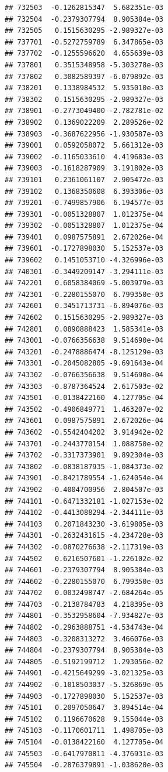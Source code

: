 \documentclass[ignorenonframetext,]{beamer}
\begin{document}
\begin{frame}[fragile]
\begin{verbatim}
## 732503  -0.1262815347  5.682351e-03
## 732504  -0.2379307794  8.905384e-03
## 732505   0.1515630295 -2.989327e-03
## 737701  -0.5272759789  6.347865e-03
## 737702  -0.1255596620  4.655639e-03
## 737801   0.3515348958 -5.303278e-03
## 737802   0.3082589397 -6.079892e-03
## 738201   0.1338984532  5.935010e-03
## 738302   0.1515630295 -2.989327e-03
## 738901  -0.2773049400 -2.782781e-02
## 738902   0.1369022209  2.289526e-02
## 738903  -0.3687622956 -1.930587e-03
## 739001   0.0592058072  5.661312e-03
## 739002  -0.1165033610  4.419683e-03
## 739003  -0.1618287909  3.191802e-03
## 739101   0.2361061107  2.905472e-03
## 739102   0.1368350608  6.393306e-03
## 739201  -0.7499857906  6.194577e-03
## 739301  -0.0051328807  1.012375e-04
## 739302  -0.0051328807  1.012375e-04
## 739401   0.0987575891  2.672026e-04
## 739601  -0.1727898030  5.152537e-03
## 739602   0.1451053710 -4.326996e-03
## 740301  -0.3449209147 -3.294111e-03
## 742201   0.6058384069 -5.003979e-03
## 742301  -0.2280155070  6.799350e-03
## 742601   0.3451713731 -6.894076e-03
## 742602   0.1515630295 -2.989327e-03
## 742801   0.0890888423  1.585341e-03
## 743001  -0.0766356638  9.514690e-04
## 743201  -0.2478886474 -8.125129e-03
## 743301  -0.2045082805 -9.691643e-04
## 743302  -0.0766356638  9.514690e-04
## 743303  -0.8787364524  2.617503e-02
## 743501  -0.0138422160  4.127705e-04
## 743502  -0.4906849771  1.463207e-02
## 743601   0.0987575891  2.672026e-04
## 743602  -0.5542404202  3.914942e-02
## 743701  -0.2443770154  1.088750e-02
## 743702  -0.3317373901  9.892304e-03
## 743802  -0.0838187935 -1.084373e-02
## 743901  -0.8421789554 -1.624054e-04
## 743902  -0.4004700956  2.804507e-03
## 744101  -0.6471332181 -1.027153e-02
## 744102  -0.4413088294 -2.344111e-03
## 744103   0.2071843230 -3.619805e-03
## 744301  -0.2632431615 -4.234728e-03
## 744302  -0.0870276638 -2.117319e-03
## 744502   0.6216507601 -1.226102e-02
## 744601  -0.2379307794  8.905384e-03
## 744602  -0.2280155070  6.799350e-03
## 744702   0.0032498747 -2.684264e-05
## 744703  -0.2138784783  4.218395e-03
## 744801  -0.3532958604 -7.934827e-03
## 744802  -0.2963888751 -4.534743e-04
## 744803  -0.3208313272  3.466076e-03
## 744804  -0.2379307794  8.905384e-03
## 744805  -0.5192199712  1.293056e-02
## 744901  -0.4215649299 -3.021325e-03
## 744902  -0.1018503037 -5.326869e-05
## 744903  -0.1727898030  5.152537e-03
## 745101   0.2097050647  3.894514e-04
## 745102   0.1196670628  9.155044e-03
## 745103  -0.1170601711  1.498705e-03
## 745104  -0.0138422160  4.127705e-04
## 745503  -0.6417970811 -4.376931e-03
## 745504  -0.2876379891 -1.038620e-03

\end{verbatim}
\end{frame}
\end{document}
